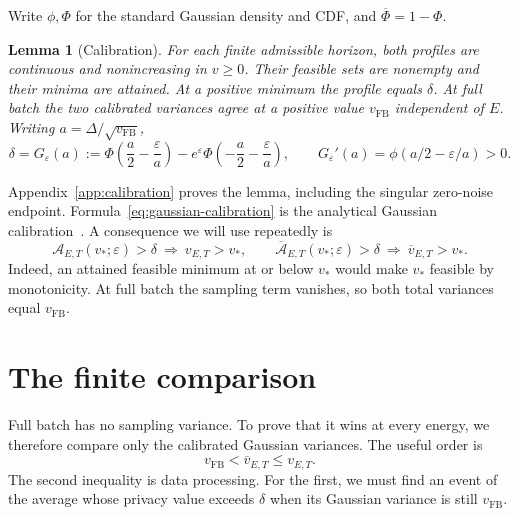 \documentclass[11pt]{article}
\newtheorem{lemma}[theorem]{Lemma}
\theoremstyle{remark}
\begin{document}
Write $\phi,\Phi$ for the standard Gaussian density and CDF, and
$\overline\Phi=1-\Phi$.
\begin{lemma}[Calibration]\label{lem:calibration}
For each finite admissible horizon, both profiles are continuous and
nonincreasing in $v\geq0$. Their feasible sets are nonempty and their minima
are attained. At a positive minimum the profile equals $\delta$.
At full batch the two calibrated variances agree at a positive value
$v_{\mathrm{FB}}$ independent of $E$. Writing $a=\Delta/\sqrt{v_{\mathrm{FB}}}$,
\begin{equation}\label{eq:gaussian-calibration}
 \delta=G_\varepsilon(a):=
 \Phi\!\left(\frac a2-\frac\varepsilon a\right)
 -e^\varepsilon\Phi\!\left(-\frac a2-\frac\varepsilon a\right),\qquad
 G_\varepsilon'(a)=\phi(a/2-\varepsilon/a)>0.
\end{equation}
\end{lemma}
Appendix~\ref{app:calibration} proves the lemma,
including the singular zero-noise endpoint. Formula~\eqref{eq:gaussian-calibration}
is the analytical Gaussian calibration~\cite{ballewang2018}.
A consequence we will use repeatedly is
\begin{equation}\label{eq:calibration-transfer}
 \mathcal A_{E,T}(v_*;\varepsilon)>\delta\ \Longrightarrow\ v_{E,T}>v_*,
 \qquad
 \overline{\mathcal A}_{E,T}(v_*;\varepsilon)>\delta\ \Longrightarrow\ \overline v_{E,T}>v_*.
\end{equation}
Indeed, an attained feasible minimum at or below $v_*$ would make $v_*$
feasible by monotonicity. At full batch the sampling term vanishes, so both
total variances equal $v_{\mathrm{FB}}$.

\section{The finite comparison}\label{sec:near-full}
Full batch has no sampling variance. To prove that it wins at every energy,
we therefore compare only the calibrated Gaussian variances. The useful
order is
\[
 v_{\mathrm{FB}}<\overline v_{E,T}\leq v_{E,T}.
\]
The second inequality is data processing. For the first, we must find an
event of the average whose privacy value exceeds $\delta$ when its Gaussian
variance is still $v_{\mathrm{FB}}$.
\end{document}
